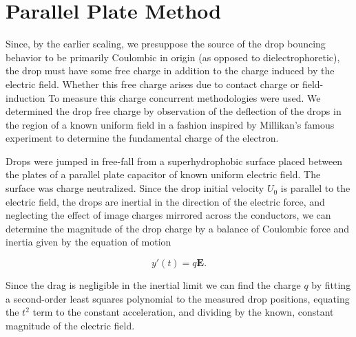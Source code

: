 \documentclass[12pt,a4paper,oneside]{book}
\begin{document}
\appendix
\appendixpage
\noappendicestocpagenum
\addappheadtotoc

\chapter{Parallel Plate Method}
\label{sec.drop_charge}
Since, by the earlier scaling, we presuppose the source of the drop bouncing behavior to be primarily Coulombic in origin (as opposed to dielectrophoretic), the drop must have some free charge in addition to the charge induced by the electric field. Whether this free charge arises due to contact charge or field-induction To measure this charge concurrent methodologies were used. We determined the drop free charge by observation of the deflection of the drops in the region of a known uniform field in a fashion inspired by Millikan's famous experiment to determine the fundamental charge of the electron.

Drops were jumped in free-fall from a superhydrophobic surface placed between the plates of a parallel plate capacitor of known uniform electric field. The surface was charge neutralized. Since the drop initial velocity $U_0$ is parallel to the electric field, the drops are inertial in the direction of the electric force, and neglecting the effect of image charges mirrored across the conductors, we can determine the magnitude of the drop charge by a balance of Coulombic force and inertia given by the equation of motion

\[ y'(t) = q\mathbf{E}. \]

Since the drag is negligible in the inertial limit we can find the charge $q$ by fitting a second-order least squares polynomial to the measured drop positions, equating the $t^2$ term to the constant acceleration, and dividing by the known, constant magnitude of the electric field.  
\end{document}
